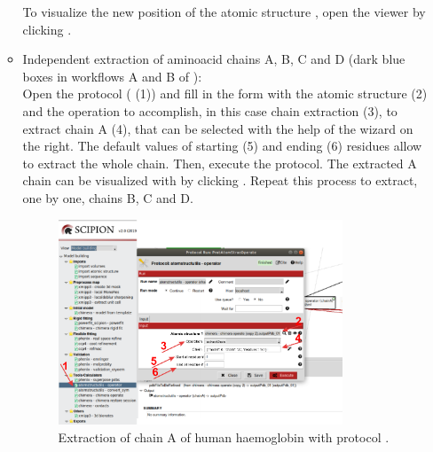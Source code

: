 \begin{itemize}
\begin{itemize}
    To visualize the new position of the atomic structure , open the \chimera viewer by clicking .

    \item Independent extraction of aminoacid chains A, B, C and D (dark blue boxes in workflows A and B of ):\\
    Open the protocol  ( (1)) and fill in the form with the atomic structure (2) and the operation to accomplish, in this case chain extraction (3), to extract chain A (4), that can be selected with the help of the wizard on the right. The default values of starting (5) and ending (6) residues allow to extract the whole chain. Then, execute the protocol. The extracted A chain can be visualized with \chimera by clicking . Repeat this process to extract, one by one, chains B, C and D.
    
        \begin{figure}[H]
            \centering 
            \captionsetup{width=.7\linewidth} 
            \includegraphics[width=0.85\textwidth]{Images/Fig47}
            \caption{Extraction of chain A of human haemoglobin  with protocol .}
            \label{fig:atomStructUtils_extractChain}
        \end{figure}
    

\end{itemize}
\end{itemize}
